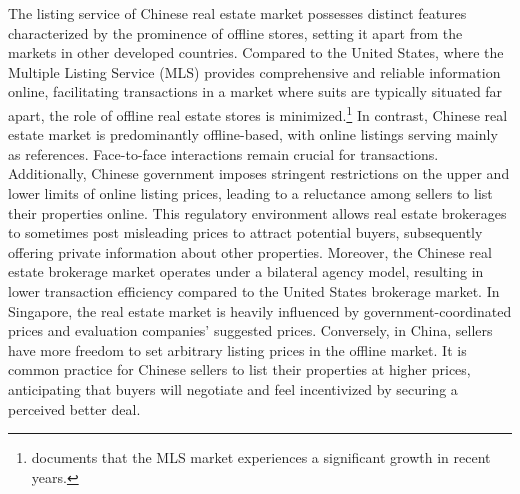 \documentclass[11pt]{article}
\begin{document}
The listing service of Chinese real estate market possesses distinct features characterized by the prominence of offline stores, setting it apart from the markets in other developed countries. Compared to the United States, where the Multiple Listing Service (MLS) provides comprehensive and reliable information online, facilitating transactions in a market where suits are typically situated far apart, the role of offline real estate stores is minimized.\footnote{\citet{hendel_relative_2009} documents that the MLS market experiences a significant growth in recent years.} In contrast, Chinese real estate market is predominantly offline-based, with online listings serving mainly as references. Face-to-face interactions remain crucial for transactions. Additionally, Chinese government imposes stringent restrictions on the upper and lower limits of online listing prices, leading to a reluctance among sellers to list their properties online. This regulatory environment allows real estate brokerages to sometimes post misleading prices to attract potential buyers, subsequently offering private information about other properties. Moreover, the Chinese real estate brokerage market operates under a bilateral agency model, resulting in lower transaction efficiency compared to the United States brokerage market. In Singapore, the real estate market is heavily influenced by government-coordinated prices and evaluation companies' suggested prices. Conversely, in China, sellers have more freedom to set arbitrary listing prices in the offline market. It is common practice for Chinese sellers to list their properties at higher prices, anticipating that buyers will negotiate and feel incentivized by securing a perceived better deal.
\end{document}
